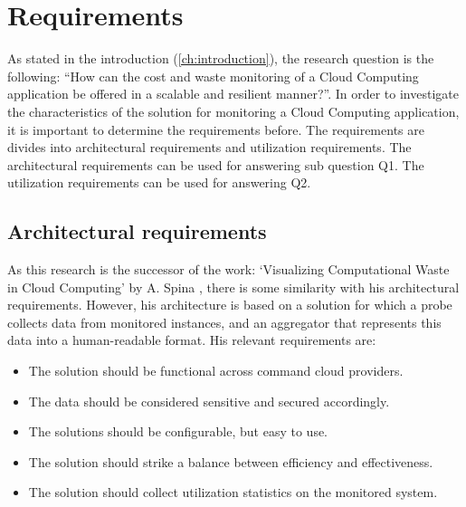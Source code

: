 \chapter{Requirements}\label{ch:requirements} %
As stated in the introduction (\autoref{ch:introduction}), the research question is the following: ``How can the cost and waste monitoring of a Cloud Computing application be offered in a scalable and resilient manner?''. In order to investigate the characteristics of the solution for monitoring a Cloud Computing application, it is important to determine the requirements before. The requirements are divides into architectural requirements and utilization requirements. The architectural requirements can be used for answering sub question Q1. The utilization requirements can be used for answering Q2. 

\section{Architectural requirements}
As this research is the successor of the work: `Visualizing Computational Waste in Cloud Computing' by A. Spina \cite{spina}, there is some similarity with his architectural requirements. However, his architecture is based on a solution for which a probe collects data from monitored instances, and an aggregator that represents this data into a human-readable format. His relevant requirements are:
\begin{itemize}
    \item The solution should be functional across command cloud providers.
    \item The data should be considered sensitive and secured accordingly.
    \item The solutions should be configurable, but easy to use.
    \item The solution should strike a balance between efficiency and effectiveness.
    \item The solution should collect utilization statistics on the monitored system. 
\end{itemize}

